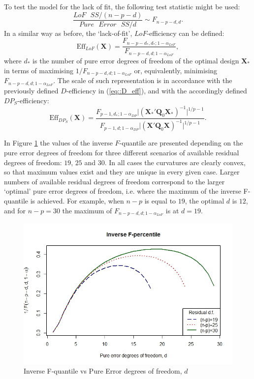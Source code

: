 To test the model for the lack of fit, the following test statistic might be used:
\begin{equation*}
\frac{LoF\mbox{ }SS/(n-p-d)}{Pure\mbox{ }Error\mbox{ }SS/d} \sim F_{n-p-d,d}.
\end{equation*}
In a similar way as before, the `lack-of-fit', $LoF$-efficiency can be defined:
\begin{equation}
\label{eq::LoF_eff}
\mbox{Eff}_{LoF}(\bm{X})=\frac{F_{n-p-d_{*},d_{*};1-\alpha_{LoF}}}{F_{n-p-d,d;1-\alpha_{LoF}}},
\end{equation}
where $d_{*}$ is the number of pure error degrees of freedom of the optimal design $\bm{X}_{*}$ in terms of maximising $1/F_{n-p-d,d;1-\alpha_{LoF}}$ or, equivalently, minimising $F_{n-p-d,d;1-\alpha_{LoF}}$. The scale of such representation is in accordance with the previously defined $D$-efficiency in (\ref{eq::D_eff}), and with the accordingly defined $DP_S$-efficiency:
\begin{equation}
\mbox{Eff}_{DP_S}(\bm{X})=\frac{F_{p-1,d_{*};1-\alpha_{DP}}\vert(\bm{X_{*}}'\bm{Q}_{0}\bm{X_{*}})^{-1}\vert ^{1/p-1}}{F_{p-1,d;1-\alpha_{DP}}\vert(\bm{X}'\bm{Q}_{0}\bm{X})^{-1}\vert ^{1/p-1}}.
\end{equation}

In Figure \ref{Fig::extraF} the values of the inverse $F$-quantile are presented depending on the pure error degrees of freedom for three different scenarios of available residual degrees of freedom: $19$, $25$ and $30$. In all cases the curvatures are clearly convex, so that maximum values exist and they are unique in every given case. Larger numbers of available residual degrees of freedom correspond to the larger `optimal' pure error degrees of freedom, i.e. where the maximum of the inverse F-quantile is achieved. For example, when $n-p$ is equal to $19$, the optimal $d$ is $12$, and for $n-p=30$ the maximum of $F_{n-p-d,d;1-\alpha_{LoF}}$ is at $d=19$.

\begin{figure}[ht]
\begin{center}
\includegraphics[scale=0.7]{Fquantile.jpeg}
\caption{Inverse F-quantile vs Pure Error degrees of freedom, $d$}
\label{Fig::extraF}
\end{center}
\end{figure}

